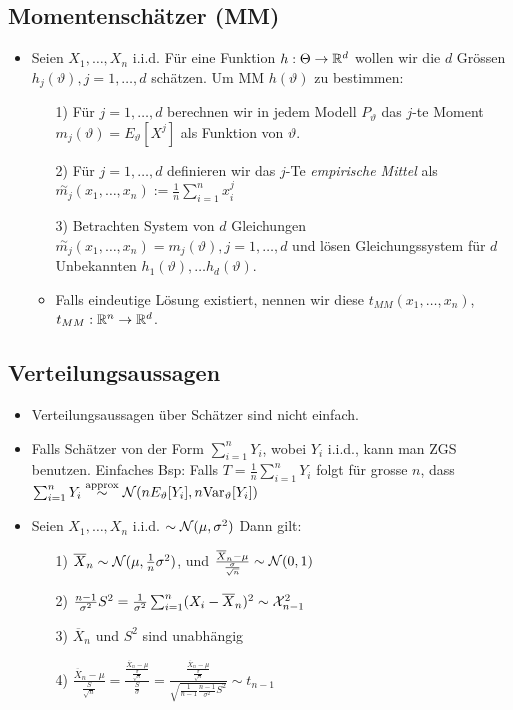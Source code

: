 \subsection{Momentenschätzer (MM)}
\begin{itemize}
    \item Seien $X_1, \dots, X_n$ i.i.d. Für eine Funktion $h: \Theta \to \mathbb{R}^d$ wollen wir die $d$ Grössen $h_j(\vartheta), j = 1, \dots, d$ schätzen. Um MM $h(\vartheta)$ zu bestimmen:
    \begin{itemize}
        \item[1)] Für $j = 1, \dots, d$ berechnen wir in jedem Modell $P_\vartheta$ das $j$-te Moment $m_j(\vartheta) = E_\vartheta[X^j]$ als Funktion von $\vartheta$.
        \item[2)] Für $j = 1, \dots, d$ definieren wir das $j$-Te \textit{empirische Mittel} als $\overset{\sim}{m_j}(x_1, \dots, x_n) := \frac{1}{n} \sum_{i=1}^{n} x_i^j$
        \item[3)] Betrachten System von $d$ Gleichungen $\overset{\sim}{m_j}(x_1, \dots, x_n) = m_j(\vartheta), j = 1, \dots, d$ und lösen Gleichungssystem für $d$ Unbekannten $h_1(\vartheta), \dots h_d(\vartheta)$.
        \item Falls eindeutige Lösung existiert, nennen wir diese $t_{MM}(x_1, \dots, x_n)$, $t_{MM}: \mathbb{R}^n \to \mathbb{R}^d$.
    \end{itemize}
\end{itemize}

\subsection{Verteilungsaussagen}
\begin{itemize}
    \item Verteilungsaussagen über Schätzer sind nicht einfach.
    \item Falls Schätzer von der Form $\sum_{i=1}^{n} Y_i$, wobei $Y_i$ i.i.d., kann man ZGS benutzen. Einfaches Bsp: Falls $T = \frac{1}{n} \sum_{i=1}^{n} Y_i$ folgt für grosse $n$, dass $\sum_{i=1}^{n} Y_i \overset{\text{approx}}{\sim} \mathcal{N}(n E_\vartheta[Y_i], n \text{Var}_\vartheta[Y_i])$
    \item Seien $X_1, \dots, X_n$ i.i.d. $\sim \mathcal{N}(\mu, \sigma^2)$ Dann gilt:
        \begin{itemize}
            \item[1)] $\overline{X}_n \sim \mathcal{N}(\mu, \frac{1}{n} \sigma^2)$, und $\frac{\overline{X}_n - \mu}{\frac{\sigma}{\sqrt{n}}} \sim \mathcal{N}(0, 1)$
            \item[2)] $\frac{n - 1}{\sigma^2}S^2 = \frac{1}{\sigma^2}\sum_{i=1}^{n} (X_i - \overline{X}_n)^2 \sim \mathcal{X}^2_{n - 1}$
            \item[3)] $\overline{X}_n$ und $S^2$ sind unabhängig
            \item[4)] $\frac{\overline{X}_n - \mu}{\frac{S}{\sqrt{n}}} = \frac{\frac{\overline{X}_n - \mu}{\frac{\sigma}{\sqrt{n}}}}{\frac{S}{\sigma}} = \frac{\frac{\overline{X}_n - \mu}{\frac{\sigma}{\sqrt{n}}}}{\sqrt{\frac{1}{n - 1}\frac{n - 1}{\sigma^2}S^2}} \sim t_{n-1}$
        \end{itemize}
\end{itemize}

